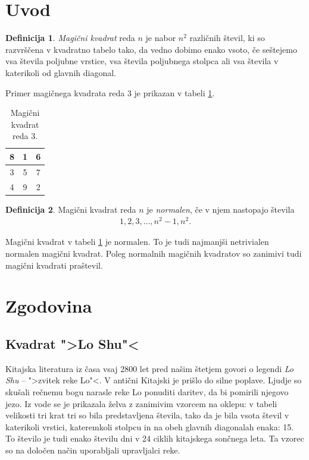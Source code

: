 \documentclass[a4paper,12pt]{article}
\theoremstyle{definition}
\newtheorem{definicija}{Definicija}
\newenvironment{magic}[3]{
    \begin{table}[h]
        \centering
        \caption{#1}
        \label{#3}
        \large
        \begin{tabular}{|*{#2}{c|}}
            \hline
            }
            {
        \end{tabular}
        \normalsize
    \end{table}
}
\newcommand{\pojem}[1]{\emph{\color{purple}#1}}
\begin{document}
\newpage

\section{Uvod}

\begin{definicija}
   \pojem{Magični kvadrat} reda $n$ je nabor $n^2$ različnih števil,
   ki so razvrščena v kvadratno tabelo tako, da vedno dobimo enako vsoto,
   če seštejemo vsa števila poljubne vrstice, vsa števila poljubnega
   stolpca ali vsa števila v katerikoli od glavnih diagonal.
\end{definicija}

Primer magičnega kvadrata reda 3 je prikazan v tabeli \ref{table:mag3}.

\begin{magic}{Magični kvadrat reda 3.}{3}{table:mag3}
        8 & 1 & 6 \\\hline
        3 & 5 & 7 \\\hline
        4 & 9 & 2 \\\hline
\end{magic}

\begin{definicija}
    Magični kvadrat reda $n$ je \pojem{normalen}, če v njem nastopajo števila
    \begin{align}
        1, 2, 3, \ldots, n^2-1, n^2. \label{eq:numbers}
    \end{align}
\end{definicija}

Magični kvadrat v tabeli \ref{table:mag3} je normalen.
To je tudi najmanjši netrivialen normalen magični kvadrat.
Poleg normalnih magičnih kvadratov so zanimivi tudi magični kvadrati praštevil.


\section{Zgodovina}

\subsection{Kvadrat ">Lo Shu"<}

Kitajska literatura iz časa vsaj 2800 let pred našim štetjem govori o legendi
\pojem{Lo Shu} -- ">zvitek reke Lo"<. V antični Kitajski je prišlo do
silne poplave. Ljudje so skušali rečnemu bogu narasle reke Lo ponuditi daritev,
da bi pomirili njegovo jezo. Iz vode se je prikazala želva z zanimivim vzorcem
na oklepu: v tabeli velikosti tri krat tri so bila predstavljena števila, tako
da je bila vsota števil v katerikoli vrstici, kateremkoli stolpcu in na obeh
glavnih diagonalah enaka: 15. To število je tudi enako številu dni v 24 ciklih
kitajskega sončnega leta. Ta vzorec so na določen način uporabljali upravljalci
reke.
\end{document}
